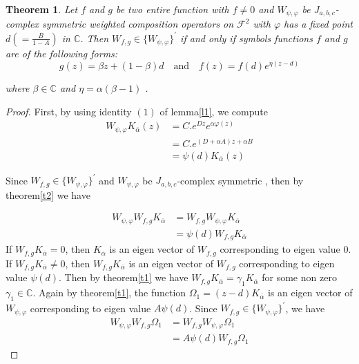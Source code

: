 \documentclass[reqno]{amsart}
\newtheorem{Theorem}{Theorem}
\theoremstyle{remark}
\theoremstyle{Definition}
\theoremstyle{remark}
\numberwithin{equation}{section}
\begin{document}
\begin{Theorem}\label{t3}
Let $f$ and $g$ be two entire function with $f\neq 0$ and $W_{\psi, \varphi}$ be $J_{a,b,c}$-complex symmetric weighted  composition operators on $\mathcal{F}^{2}$ with $\varphi$ has a fixed point 
$d(=\frac{B}{1-A})$ in $\mathbb{C}$. Then $W_{f,g} \in \{W_{\psi, \varphi}\}^{'}$ if and only if symbols functions $f$ and $g$ are of the following forms:
\begin{equation}\label{e1}
  g(z)= \beta z+ (1-\beta) d \text{~~ and ~~} f(z)= f(d) e^{\eta(z-d)}  
\end{equation}

where  $\beta \in \mathbb{C}$ and $ \eta = \alpha (\beta -1)$ .
\end{Theorem}
\begin{proof}
First, by using identity $(1)$ of lemma\ref{l1}, we compute
\begin{align*}
    W_{\psi, \varphi}K_{\overline{\alpha}}(z)&= C.e^{Dz}e^{\alpha \varphi(z)}\\
    &= C. e^{(D+\alpha A)z+\alpha B}\\
    &= \psi(d)K_{\overline{\alpha}}(z)
\end{align*}
    

  Since $W_{f,g} \in \{W_{\psi, \varphi}\}^{'}$ and $W_{\psi, \varphi}$ be $J_{a,b,c}$-complex symmetric , then by theorem\ref{t2} we have

  \begin{align*}
  W_{\psi, \varphi}W_{f,g}K_{\overline{\alpha}}&= W_{f,g}W_{\psi, \varphi}K_{\overline{\alpha}}\\
  &= \psi(d)W_{f,g}K_{\overline{\alpha}}
  \end{align*}
If $W_{f,g}K_{\overline{\alpha}}=0$, then $K_{\overline{\alpha}}$ is an eigen vector of $W_{f,g}$ corresponding to eigen value 0.
If $W_{f,g}K_{\overline{\alpha}}\neq 0$, then $W_{f,g}K_{\overline{\alpha}}$ is an eigen vector of $W_{f,g}$ corresponding to eigen value 
$\psi(d)$. Then by theorem\ref{t1} we have $W_{f,g}K_{\overline{\alpha}}= \gamma_{1}K_{\overline{\alpha}}$ for some non zero $\gamma_{1}\in \mathbb{C}$. Again by theorem\ref{t1}, the function $\Omega_{1}= (z-d)K_{\overline{\alpha}}$ is an eigen vector of $W_{\psi, \varphi}$ corresponding to eigen value $A\psi(d)$.
Since $W_{f,g} \in \{W_{\psi, \varphi}\}^{'}$, we have 
\begin{align*}W_{\psi, \varphi}W_{f,g}\Omega_{1}&=W_{f,g}W_{\psi, \varphi}\Omega_{1}\\
&=A\psi(d) W_{f,g}\Omega_{1} 
\end{align*}


\end{proof}
\end{document}
